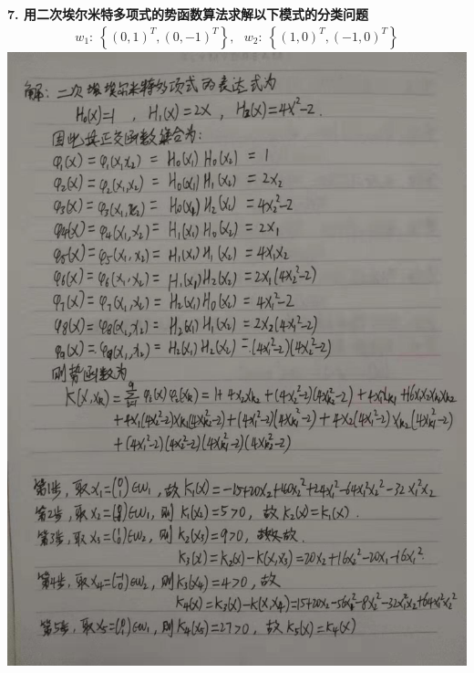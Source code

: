 \documentclass[a4paper, UTF8, 12pt]{ctexart}
\begin{document}
    \newpage
    \textbf{7. 用二次埃尔米特多项式的势函数算法求解以下模式的分类问题} \newline
    \begin{equation*}
        \begin{split}
            w_1: \ \left\{ {\left(0,1 \right)}^T, {\left(0,-1\right)}^T \right\}, \ \ \ 
            w_2: \ \left\{{\left(1,0\right)}^T, {\left(-1,0\right)}^T \right\}
        \end{split}
    \end{equation*}
    \includegraphics[scale=0.46]{asw7_0.jpg}
\end{document}
